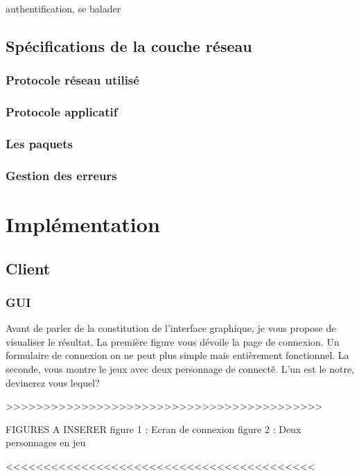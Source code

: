 \documentclass[11pt, a4paper]{report}
\begin{document}
    authentification, se balader
    
  \chapter{Spécifications de la couche réseau}
  
    \section{Protocole réseau utilisé}
  
    \section{Protocole applicatif}
    
    \section{Les paquets}
    
    \section{Gestion des erreurs}
    
\part{Implémentation}
  
  \chapter{Client}

	\section{GUI}

	Avant de parler de la constitution de l'interface graphique, je vous propose de visualiser le résultat. La première figure vous dévoile la page de connexion. Un formulaire de connexion on ne peut plus simple mais entièrement fonctionnel.
	La seconde, vous montre le jeux avec deux personnage de connecté. L'un est le notre, devinerez vous lequel?
	
	
	>>>>>>>>>>>>>>>>>>>>>>>>>>>>>>>>>>>>>>>>>>
	
	FIGURES A INSERER 
	figure 1 : Ecran de connexion
	figure 2 : Deux personnages en jeu
	
	<<<<<<<<<<<<<<<<<<<<<<<<<<<<<<<<<<<<<<<<<
	
\end{document}
